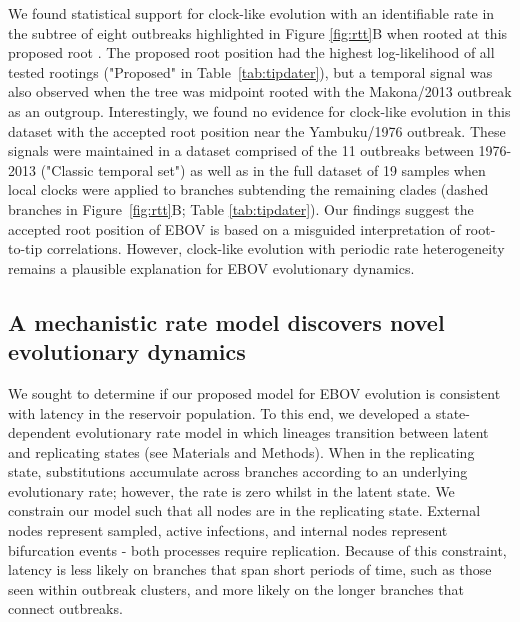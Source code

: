 \documentclass[11pt,a4paper]{article}
\begin{document}
\begin{table}[t]
\centering
\caption{\textbf{Temporal signal in subsets of EBOV outbreaks.}
Model - the clock model used (DR: different rates, i.e. no clock; SR: single rate, i.e. unidentifiable clock; SRDT: single rate dated tips, i.e. identifiable clock; localSR/SRDT - an SR/SRDT model with local clocks on dashed between-cluster branches Figure~\ref{fig:rtt}).
For the 1970s rooting, branches that appear dashed in Figure~\ref{fig:rtt}A have local clocks. For all other roots dashed branches in Figure~\ref{fig:rtt}B are used.
LL - Log likelihood, $\Delta$LL - Log likelihood difference from the best model,
df - degrees of freedom in a chi-squared test,
p - p-value of a chi-squared test, 
Base rate - the inferred evolutionary rate (where applicable),
Root - the root position used in the analysis (see Figure~\ref{fig:map}B)}

\label{tab:tipdater}
\end{table}

We found statistical support for clock-like evolution with an identifiable rate in the subtree of eight outbreaks highlighted in Figure \ref{fig:rtt}B when rooted at this proposed root \cite{Rambaut2000-ss}.
The proposed root position had the highest log-likelihood of all tested rootings ("Proposed" in Table~\ref{tab:tipdater}), but a temporal signal was also observed when the tree was midpoint rooted with the Makona/2013 outbreak as an outgroup. 
Interestingly, we found no evidence for clock-like evolution in this dataset with the accepted root position near the Yambuku/1976 outbreak. 
These signals were maintained in a dataset comprised of the 11 outbreaks between 1976-2013 ("Classic temporal set") as well as in the full dataset of 19 samples when local clocks were applied to branches subtending the remaining clades (dashed branches in Figure~\ref{fig:rtt}B; Table \ref{tab:tipdater}).
Our findings suggest the accepted root position of EBOV is based on a misguided interpretation of root-to-tip correlations.
However, clock-like evolution with periodic rate heterogeneity remains a plausible explanation for EBOV evolutionary dynamics. 


\subsection*{A mechanistic rate model discovers novel evolutionary dynamics}

We sought to determine if our proposed model for EBOV evolution is consistent with latency in the reservoir population.
To this end, we developed a state-dependent evolutionary rate model in which lineages transition between latent and replicating states (see Materials and Methods).
When in the replicating state, substitutions accumulate across branches according to an underlying evolutionary rate; however, the rate is zero whilst in the latent state.
We constrain our model such that all nodes are in the replicating state.
External nodes represent sampled, active infections, and internal nodes represent bifurcation events - both processes require replication.
Because of this constraint, latency is less likely on branches that span short periods of time, such as those seen within outbreak clusters, and more likely on the longer branches that connect outbreaks. 
\end{document}

